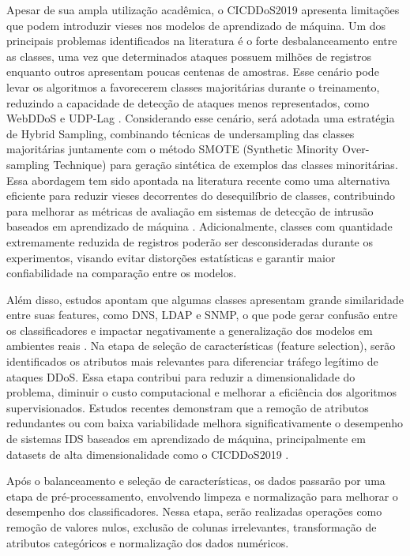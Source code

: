 \documentclass[
    12pt,                %
    openright,           %
    oneside,             %
    a4paper,             %
    english,             %
    brazil               %
]{abntex2}
\begin{document}
Apesar de sua ampla utilização acadêmica, o CICDDoS2019 apresenta limitações que podem introduzir vieses nos modelos de aprendizado de máquina. Um dos principais problemas identificados na literatura é o forte desbalanceamento entre as classes, uma vez que determinados ataques possuem milhões de registros enquanto outros apresentam poucas centenas de amostras. Esse cenário pode levar os algoritmos a favorecerem classes majoritárias durante o treinamento, reduzindo a capacidade de detecção de ataques menos representados, como WebDDoS e UDP-Lag \cite{Kathi2026}. Considerando esse cenário, será adotada uma estratégia de Hybrid Sampling, combinando técnicas de undersampling das classes majoritárias juntamente com o método SMOTE (Synthetic Minority Over-sampling Technique) para geração sintética de exemplos das classes minoritárias. Essa abordagem tem sido apontada na literatura recente como uma alternativa eficiente para reduzir vieses decorrentes do desequilíbrio de classes, contribuindo para melhorar as métricas de avaliação em sistemas de detecção de intrusão baseados em aprendizado de máquina \cite{Mualfah2025}. Adicionalmente, classes com quantidade extremamente reduzida de registros poderão ser desconsideradas durante os experimentos, visando evitar distorções estatísticas e garantir maior confiabilidade na comparação entre os modelos.

Além disso, estudos apontam que algumas classes apresentam grande similaridade entre suas features, como DNS, LDAP e SNMP, o que pode gerar confusão entre os classificadores e impactar negativamente a generalização dos modelos em ambientes reais \cite{Bashaiwth2023}. Na etapa de seleção de características (feature selection), serão identificados os atributos mais relevantes para diferenciar tráfego legítimo de ataques DDoS. Essa etapa contribui para reduzir a dimensionalidade do problema, diminuir o custo computacional e melhorar a eficiência dos algoritmos supervisionados. Estudos recentes demonstram que a remoção de atributos redundantes ou com baixa variabilidade melhora significativamente o desempenho de sistemas IDS baseados em aprendizado de máquina, principalmente em datasets de alta dimensionalidade como o CICDDoS2019 \cite{Kathi2026}.

Após o balanceamento e seleção de características, os dados passarão por uma etapa de pré-processamento, envolvendo limpeza e normalização para melhorar o desempenho dos classificadores. Nessa etapa, serão realizadas operações como remoção de valores nulos, exclusão de colunas irrelevantes, transformação de atributos categóricos e normalização dos dados numéricos. 
\end{document}
